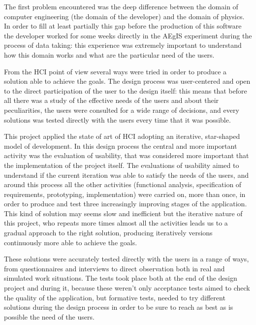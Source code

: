 The first problem encountered was the deep difference between the domain of computer engineering (the domain of the developer) and the domain of physics. In order to fill at least partially this gap before the production of this software the developer worked for some weeks directly in the AEgIS experiment during the process of data taking: this experience was extremely important to understand how this domain works and what are the particular need of the users.

From the HCI point of view several ways were tried in order to produce a solution able to achieve the goals. 
The design process was user-centered and open to the direct participation of the user to the design itself: this means that before all there was a study of the effective needs of the users and about their peculiarities, the users were consulted for a wide range of decisions, and every solutions was tested directly with the users every time that it was possible. 
  
This project applied the state of art of HCI adopting an iterative, star-shaped model of development. In this design process the central and more important activity was the evaluation of usability, that was considered more important that the implementation of the project itself. The evaluations of usability aimed to understand if the current iteration was able to satisfy the needs of the users, and around this process all the other activities (functional analysis, specification of requirements, prototyping, implementation) were carried on, more than once, in order to produce and test three increasingly improving stages of the application. 
This kind of solution may seems slow and inefficient but the iterative nature of this project, who repeats more times almost all the activities leads us to a gradual approach to the right solution, producing iteratively versions continuously more able to achieve the goals.

These solutions were accurately tested directly with the users in a range of ways, from questionnaires and interviews to direct observation both in real and simulated work situations.
The tests took place both at the end of the design project and during it, because these weren't only acceptance tests aimed to check the quality of the application, but formative tests, needed to try different solutions during the design process in order to be sure to reach as best as is possible the need of the users.

